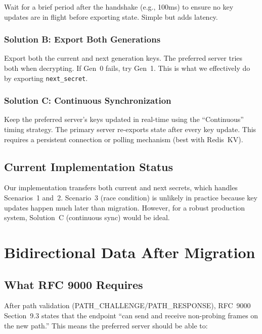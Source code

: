 \documentclass[11pt,a4paper]{article}
\begin{document}
Wait for a brief period after the handshake (e.g., 100ms) to ensure no key updates are in flight before exporting state. Simple but adds latency.

\subsubsection{Solution B: Export Both Generations}

Export both the current and next generation keys. The preferred server tries both when decrypting. If Gen~0 fails, try Gen~1. This is what we effectively do by exporting \texttt{next\_secret}.

\subsubsection{Solution C: Continuous Synchronization}

Keep the preferred server's keys updated in real-time using the ``Continuous'' timing strategy. The primary server re-exports state after every key update. This requires a persistent connection or polling mechanism (best with Redis~KV).

\subsection{Current Implementation Status}

Our implementation transfers both current and next secrets, which handles Scenarios~1 and~2. Scenario~3 (race condition) is unlikely in practice because key updates happen much later than migration. However, for a robust production system, Solution~C (continuous sync) would be ideal.

\newpage
\section{Bidirectional Data After Migration}

\subsection{What RFC 9000 Requires}

After path validation (PATH\_CHALLENGE/PATH\_RESPONSE), RFC~9000 Section~9.3 states that the endpoint ``can send and receive non-probing frames on the new path.'' This means the preferred server should be able to:
\end{document}

